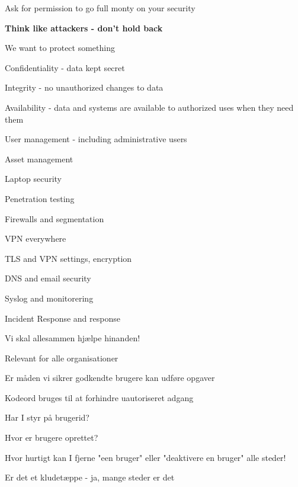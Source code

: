 \documentclass[Screen16to9,17pt]{foils}
\begin{document}
Ask for permission to go full monty on your security

{\bf Think like attackers - don't hold back}




\begin{list1}
\item We want to protect something
\item Confidentiality - data kept secret
\item Integrity - no unauthorized changes to data
\item Availability - data and systems are available to authorized uses when they need them
\end{list1}



\begin{list2}
\item User management - including administrative users
\item Asset management
\item Laptop security
\item Penetration testing
\item Firewalls and segmentation
\item VPN everywhere
\item TLS and VPN settings, encryption
\item DNS and email security
\item Syslog and monitorering
\item Incident Response and response
\end{list2}

\vskip 5mm
\centerline{Vi skal allesammen hjælpe hinanden!}





\begin{list2}
\item Relevant for alle organisationer
\item Er måden vi sikrer godkendte brugere kan udføre opgaver
\item Kodeord bruges til at forhindre uautoriseret adgang
\item Har I styr på brugerid?
\item Hvor er brugere oprettet?
\item Hvor hurtigt kan I fjerne "een bruger" eller "deaktivere en bruger" alle steder!
\item Er det et kludetæppe - ja, mange steder er det
\end{list2}
\end{document}
